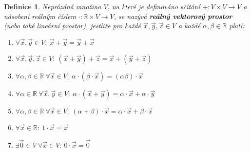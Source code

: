 \documentclass{article}
\newtheorem{df}{Definice}
\newcommand{\0}{\vec{0}}
\newcommand{\R}{\mathbb R}
\newcommand{\xx}{\vec{x}}
\newcommand{\yy}{\vec{y}}
\newcommand{\zz}{\vec{z}}
\begin{document}
\begin{df}
\label{df:vekt_prostor}
Neprázdná množina $V$, na které je definováno sčítání $+:V\times V\to V$ a násobení reálným číslem $\cdot:\R\times V\to V$, se nazývá {\bf reálný vektorový prostor} (nebo také lineární prostor), jestliže pro každé $\xx, \yy, \zz\in V$ a každé $\alpha,\beta\in\R$ platí:
\begin{enumerate}
\item $\forall\xx,\yy\in V:~\xx+\yy=\yy+\xx$ 
\item $\forall\xx,\yy,\zz\in V:~(\xx+\yy)+\zz=\xx+(\yy+\zz)$ 
\item $\forall\alpha,\beta\in\R~\forall\xx\in V:~\alpha\cdot(\beta\cdot\xx)=(\alpha\beta)\cdot\xx$ 
\item $\forall\alpha\in\R~\forall\xx,\yy\in V:~\alpha\cdot(\xx+\yy)=\alpha\cdot\xx+\alpha\cdot\yy$ 
\item $\forall\alpha,\beta\in\R~\forall\xx\in V:~(\alpha+\beta)\cdot\xx=\alpha\cdot\xx+\beta\cdot\xx$ 
\item $\forall\xx\in\R:~1\cdot\xx=\xx$ 
\item $\exists\0\in V ~\forall\xx\in V:~0\cdot\xx=\0$ 
\end{enumerate}
\end{df}
\end{document}
